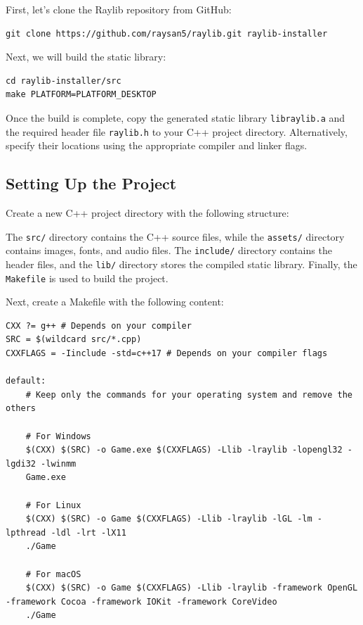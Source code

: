 First, let's clone the Raylib repository from GitHub:
\begin{verbatim}
git clone https://github.com/raysan5/raylib.git raylib-installer
\end{verbatim}

Next, we will build the static library:
\begin{verbatim}
cd raylib-installer/src
make PLATFORM=PLATFORM_DESKTOP
\end{verbatim}

Once the build is complete, copy the generated static library \texttt{libraylib.a} and the required header file \texttt{raylib.h} to your C++ project directory. Alternatively, specify their locations using the appropriate compiler and linker flags.

\subsection{Setting Up the Project}

Create a new C++ project directory with the following structure:

The \texttt{src/} directory contains the C++ source files, while the \texttt{assets/} directory contains images, fonts, and audio files. The \texttt{include/} directory contains the header files, and the \texttt{lib/} directory stores the compiled static library. Finally, the \texttt{Makefile} is used to build the project.

Next, create a Makefile with the following content:
\begin{verbatim}
CXX ?= g++ # Depends on your compiler
SRC = $(wildcard src/*.cpp)
CXXFLAGS = -Iinclude -std=c++17 # Depends on your compiler flags

default:
    # Keep only the commands for your operating system and remove the others

    # For Windows
    $(CXX) $(SRC) -o Game.exe $(CXXFLAGS) -Llib -lraylib -lopengl32 -lgdi32 -lwinmm
    Game.exe

    # For Linux
    $(CXX) $(SRC) -o Game $(CXXFLAGS) -Llib -lraylib -lGL -lm -lpthread -ldl -lrt -lX11
    ./Game

    # For macOS
    $(CXX) $(SRC) -o Game $(CXXFLAGS) -Llib -lraylib -framework OpenGL -framework Cocoa -framework IOKit -framework CoreVideo
    ./Game
\end{verbatim}

